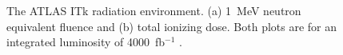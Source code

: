 \begin{figure}[ht]
\centering
{}\quad
{}
\caption{The ATLAS ITk radiation environment. (a) 1~MeV neutron equivalent fluence and (b) total ionizing dose. Both plots are for an integrated luminosity of 4000~fb$^{-1}$ \cite{background}.}
\label{fig:radiation}
\end{figure}
